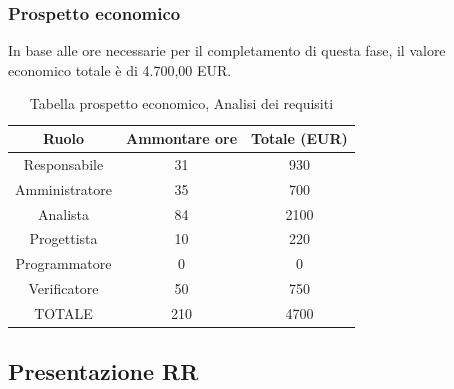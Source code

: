 \subsubsection{Prospetto economico}
In base alle ore necessarie per il completamento di questa fase, il valore economico totale è di 4.700,00 EUR.
\begin{table}[h]
	\caption{Tabella prospetto economico, Analisi dei requisiti}  
\begin{center}
\begin{tabular}{ |c|c|c|  }
 \hline
 Ruolo 		& Ammontare ore 	& Totale (EUR)\\
 	\hline
 \hline
 	Responsabile	& 31 	& 930\\
	Amministratore	& 35		& 700\\
	Analista		& 84 	& 2100\\
	Progettista		& 10		& 220\\
	Programmatore	& 0		& 0\\
	Verificatore	& 50		& 750\\
 \hline\hline
 TOTALE		& 210		& 4700\\
  \hline
\end{tabular}
\end{center}
\end{table}
\newpage
\subsection{Presentazione RR}

